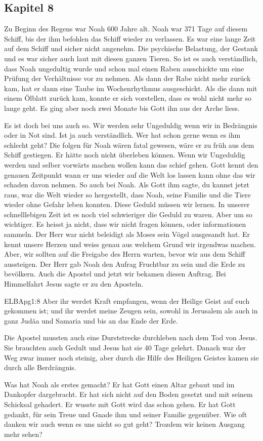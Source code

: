 \subsection{Kapitel 8}
Zu Beginn des Regens war Noah 600 Jahre alt. Noah war 371 Tage auf diesem Schiff, bis der \herr ihm befohlen das Schiff wieder zu verlassen. Es war eine lange Zeit auf dem Schiff und sicher nicht angenehm. Die psychische Belastung, der Gestank und es war sicher auch laut mit diesen ganzen Tieren. So ist es auch verständlich, dass Noah ungedultig wurde und schon mal einen Raben ausschickte um eine Prüfung der Verhältnisse vor zu nehmen. Als dann der Rabe nicht mehr zurück kam, hat er dann eine Taube im Wochenrhythmus ausgeschickt. Als die dann mit einem Ölblatt zurück kam, konnte er sich vorstellen, dass es wohl nicht mehr so lange geht. Es ging aber noch zwei Monate bis Gott ihn aus der Arche liess.

Es ist doch bei uns auch so. Wir werden sehr Ungeduldig wenn wir in Bedrängnis oder in Not sind. Ist ja auch verständlich. Wer hat schon gerne wenn es ihm schlecht geht? Die folgen für Noah wären fatal gewesen, wäre er zu früh aus dem Schiff gestiegen. Er hätte noch nicht überleben können. Wenn wir Ungeduldig werden und selber vorwärts machen wollen kann das schief gehen. Gott kennt den genauen Zeitpunkt wann er uns wieder auf die Welt los lassen kann ohne das wir schaden davon nehmen. So auch bei Noah. Als Gott ihm sagte, du kannst jetzt raus, war die Welt wieder so hergestellt, dass Noah, seine Familie und die Tiere wieder ohne Gefahr leben konnten. Diese Geduld müssen wir lernen. In unserer schnelllebigen Zeit ist es noch viel schwieriger die Geduld zu waren. Aber um so wichtiger. Es heisst ja nicht, dass wir nicht fragen können, oder informationen sammeln. Der Herr war nicht beleidigt als Moses sein Vögel ausgesandt hat. Er kennt unsere Herzen und weiss genau aus welchem Grund wir irgendwas machen. Aber, wir sollten auf die Freigabe des Herrn warten, bevor wir aus dem Schiff aussteigen. Der Herr gab Noah den Aufrag Fruchtbar zu sein und die Erde zu bevölkern. Auch die Apostel und jetzt wir bekamen diesen Auftrag. Bei Himmelfahrt Jesus sagte er zu den Aposteln. 
\begin{bibeltext}{ELB}{Apg}{1:8}
	Aber ihr werdet Kraft empfangen, wenn der Heilige Geist auf euch gekommen ist; und ihr werdet meine Zeugen sein, sowohl in Jerusalem als auch in ganz Judäa und Samaria und bis an das Ende der Erde.
\end{bibeltext} 
Die Apostel mussten auch eine Durststrecke durchleben nach dem Tod von Jesus. Sie brauchten auch Gedult und Jesus hat sie 40 Tage gelehrt. Danach war der Weg zwar immer noch steinig, aber durch die Hilfe des Heiligen Geistes kamen sie durch alle Berdrängnis.

Was hat Noah als erstes gemacht? Er hat Gott einen Altar gebaut und im Dankopfer dargebracht. Er hat sich nicht auf den Boden gesetzt und mit seinem Schicksal gehadert. Er wusste mit Gott wird das schon gehen. Er hat Gott gedankt, für sein Treue und Gnade ihm und seiner Familie gegenüber. Wie oft danken wir auch wenn es uns nicht so gut geht? Trozdem wir keinen Ausgang mehr sehen?